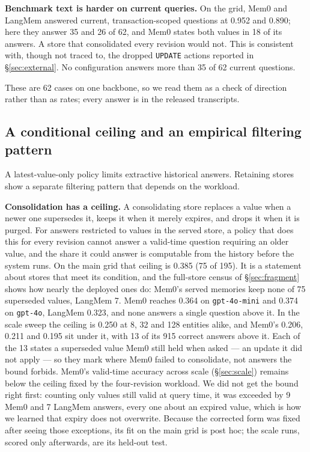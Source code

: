 \documentclass[conference]{IEEEtran}
\begin{document}
\textbf{Benchmark text is harder on current queries.} On the grid, Mem0 and LangMem
answered current, transaction-scoped questions at 0.952 and 0.890; here they
answer 35 and 26 of 62, and Mem0 states both values in 18 of its answers. A
store that consolidated every revision would not. This is consistent with,
though not traced to, the dropped \texttt{UPDATE} actions reported in
\S\ref{sec:external}. No configuration answers more than 35 of 62 current questions.

These are 62 cases on one backbone, so we read them as a check of direction
rather than as rates; every answer is in the released transcripts.

\subsection{A conditional ceiling and an empirical filtering pattern}\label{sec:bounds}

A latest-value-only policy limits extractive historical answers. Retaining
stores show a separate filtering pattern that depends on the workload.

\textbf{Consolidation has a ceiling.} A consolidating store replaces a value
when a newer one supersedes it, keeps it when it merely expires, and drops it
when it is purged. For answers restricted to values in the served store, a policy that does
this for every revision cannot answer a valid-time question requiring an
older value, and the share it
could answer is computable from the history before the system runs. On the main
grid that ceiling is 0.385 (75 of 195). It is a statement about stores that
meet its condition, and the full-store census of \S\ref{sec:fragment} shows how
nearly the deployed ones do: Mem0's served memories keep none of 75 superseded
values, LangMem 7.
Mem0 reaches 0.364 on
\texttt{gpt-4o-mini} and 0.374 on \texttt{gpt-4o}, LangMem 0.323, and none
answers a single question above it. In the scale sweep the ceiling is 0.250 at
8, 32 and 128 entities alike, and Mem0's 0.206, 0.211 and 0.195 sit under it,
with 13 of its 915 correct answers above it. Each of the 13 states a superseded
value Mem0 still held when asked --- an update it did not apply --- so they mark
where Mem0 failed to consolidate, not answers the bound forbids. Mem0's valid-time accuracy
across scale (\S\ref{sec:scale}) remains below the ceiling fixed by the
four-revision workload. We did not get the bound right first: counting only values still
valid at query time, it was exceeded by 9 Mem0 and 7 LangMem answers, every one
about an expired value, which is how we learned that expiry does not overwrite.
Because the corrected form was fixed after seeing those exceptions, its fit on
the main grid is post hoc; the scale runs, scored only afterwards, are its
held-out test.
\end{document}
